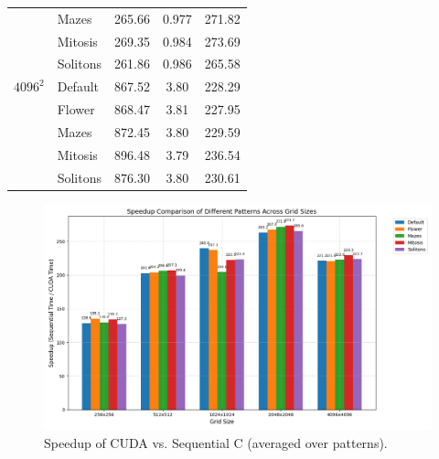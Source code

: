 \documentclass[9pt]{IEEEtran} %
\begin{document}
\begin{table}[H]
{\begin{tabular}{l l S[table-format=3.2] S[table-format=1.3] S[table-format=3.2]}
          & Mazes     & 265.66           & 0.977             & 271.82        \\
          & Mitosis   & 269.35           & 0.984             & 273.69        \\
          & Solitons  & 261.86           & 0.986             & 265.58        \\
\midrule
$4096^2$  & Default   & 867.52           & 3.80              & 228.29        \\ %
          & Flower    & 868.47           & 3.81              & 227.95        \\ %
          & Mazes     & 872.45           & 3.80              & 229.59        \\ %
          & Mitosis   & 896.48           & 3.79              & 236.54        \\
          & Solitons  & 876.30           & 3.80              & 230.61        \\
\bottomrule
\end{tabular}%
} %
\end{table}

\begin{figure}[H]
    \centering
    \includegraphics[width=0.9\columnwidth]{speedup.png} %
    \caption{Speedup of CUDA vs. Sequential C (averaged over patterns).}
    \label{fig:speedup_plot}
\end{figure}
\end{document}
